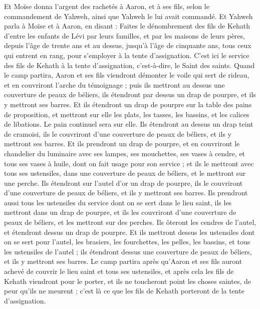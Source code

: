 \begin{multicols}{2}
Et Moïse donna l'argent des rachetés à Aaron, et à ses fils, selon le commandement de Yahweh, ainsi que Yahweh le lui avait commandé.
\VerseOne{}Et Yahweh parla à Moïse et à Aaron, en disant :
Faites le dénombrement des fils de Kehath d'entre les enfants de Lévi par leurs familles, et par les maisons de leurs pères,
depuis l'âge de trente ans et au dessus, jusqu'à l'âge de cinquante ans, tous ceux qui entrent en rang, pour s'employer à la tente d'assignation.
C'est ici le service des fils de Kehath à la tente d'assignation, c'est-à-dire, le Saint des saints.
Quand le camp partira, Aaron et ses fils viendront démonter le voile qui sert de rideau, et en couvriront l'arche du témoignage ;
puis ils mettront au dessus une couverture de peaux de béliers, ils étendront par dessus un drap de pourpre, et ils y mettront ses barres.
Et ils étendront un drap de pourpre sur la table des pains de proposition, et mettront sur elle les plats, les tasses, les bassins, et les calices de libations. Le pain continuel sera sur elle.
Ils étendront au dessus un drap teint de cramoisi, ils le couvriront d'une couverture de peaux de béliers, et ils y mettront ses barres.
Et ils prendront un drap de pourpre, et en couvriront le chandelier du luminaire avec ses lampes, ses mouchettes, ses vases à cendre, et tous ses vases à huile, dont on fait usage pour son service ;
et ils le mettront avec tous ses ustensiles, dans une couverture de peaux de béliers, et le mettront sur une perche.
Ils étendront sur l'autel d'or un drap de pourpre, ils le couvriront d'une couverture de peaux de béliers, et ils y mettront ses barres.
Ils prendront aussi tous les ustensiles du service dont on se sert dans le lieu saint, ils les mettront dans un drap de pourpre, et ils les couvriront d'une couverture de peaux de béliers, et les mettront sur des perches.
Ils ôteront les cendres de l'autel, et étendront dessus un drap de pourpre.
Et ils mettront dessus les ustensiles dont on se sert pour l'autel, les brasiers, les fourchettes, les pelles, les bassins, et tous les ustensiles de l'autel ; ils étendront dessus une couverture de peaux de béliers, et ils y mettront ses barres.
Le camp partira après qu'Aaron et ses fils auront achevé de couvrir le lieu saint et tous ses ustensiles, et après cela les fils de Kehath viendront pour le porter, et ils ne toucheront point les choses saintes, de peur qu'ils ne meurent ; c'est là ce que les fils de Kehath porteront de la tente d'assignation.

\end{multicols}
